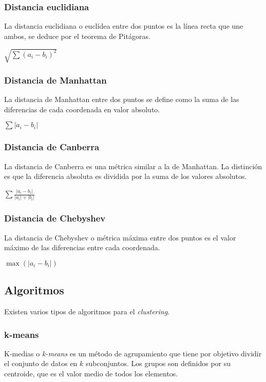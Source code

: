 \subsubsection{Distancia euclidiana}
La distancia euclidiana o euclídea \cite{wiki:euclidiana} entre dos puntos es la línea recta que une ambos, se deduce por el teorema de Pitágoras.

$\sqrt{\sum(a_{i} - b_{i})^{2}}$

\subsubsection{Distancia de Manhattan}
La distancia de Manhattan \cite{manhattan} entre dos puntos se define como la suma de las diferencias de cada coordenada en valor absoluto.

$\sum|a_{i} - b_{i}|$

\subsubsection{Distancia de Canberra}
La distancia de Canberra \cite{canberra} es una métrica similar a la de Manhattan. La distinción es que la diferencia absoluta es dividida por la suma de los valores absolutos.

$\sum \frac{|a_{i} - b_{i}|}{|a_{i}| + |b_{i}|}$

\subsubsection{Distancia de Chebyshev}
La distancia de Chebyshev o métrica máxima \cite{wiki:chebyshov} entre dos puntos es el valor máximo de las diferencias entre cada coordenada.

$\max(|a_{i} - b_{i}|)$


\subsection{Algoritmos}
Existen varios tipos de algoritmos para el \emph{clustering}.

\subsubsection{k-means}
K-medias o \emph{k-means} \cite{wiki:kmedias} es un método de agrupamiento que tiene por objetivo dividir el conjunto de datos en $\mathit{k}$ subconjuntos. Los grupos son definidos por su centroide, que es el valor medio de todos los elementos.


